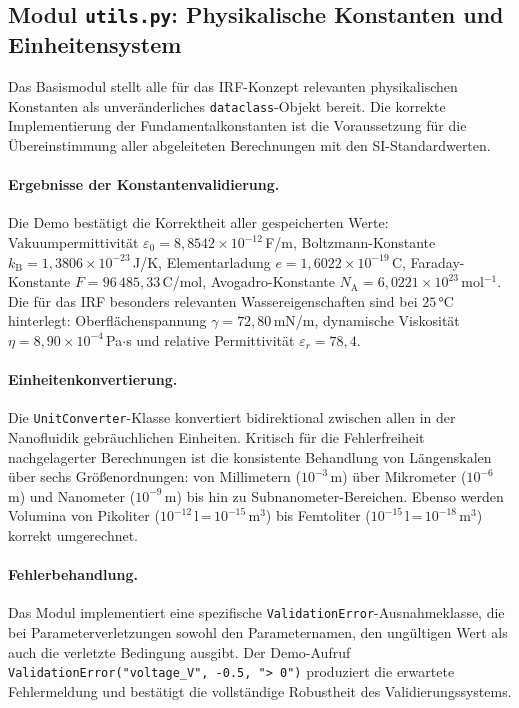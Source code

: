 ﻿\documentclass[a4paper,12pt]{scrreprt}
\theoremstyle{definition}
\begin{document}
\subsection{Modul \texttt{utils.py}: Physikalische Konstanten und Einheitensystem}

Das Basismodul stellt alle für das IRF-Konzept relevanten physikalischen
Konstanten als unveränderliches \texttt{dataclass}-Objekt bereit. Die korrekte
Implementierung der Fundamentalkonstanten ist die Voraussetzung für die
Übereinstimmung aller abgeleiteten Berechnungen mit den SI-Standardwerten.

\paragraph{Ergebnisse der Konstantenvalidierung.}
Die Demo bestätigt die Korrektheit aller gespeicherten Werte:
Vakuumpermittivität $\varepsilon_0 = 8{,}8542 \times 10^{-12}$\,F/m,
Boltzmann-Konstante $k_\text{B} = 1{,}3806 \times 10^{-23}$\,J/K,
Elementarladung $e = 1{,}6022 \times 10^{-19}$\,C,
Faraday-Konstante $F = 96\,485{,}33$\,C/mol,
Avogadro-Konstante $N_\text{A} = 6{,}0221 \times 10^{23}$\,mol$^{-1}$.
Die für das IRF besonders relevanten Wassereigenschaften sind bei $25\, °\text{C}$
hinterlegt: Oberflächenspannung $\gamma = 72{,}80$\,mN/m,
dynamische Viskosität $\eta = 8{,}90 \times 10^{-4}$\,Pa$\cdot$s und
relative Permittivität $\varepsilon_r = 78{,}4$.

\paragraph{Einheitenkonvertierung.}
Die \texttt{UnitConverter}-Klasse konvertiert bidirektional zwischen allen in
der Nanofluidik gebräuchlichen Einheiten. Kritisch für die Fehlerfreiheit
nachgelagerter Berechnungen ist die konsistente Behandlung von Längenskalen über
sechs Größenordnungen: von Millimetern ($10^{-3}$\,m) über Mikrometer ($10^{-6}$\,m)
und Nanometer ($10^{-9}$\,m) bis hin zu Subnanometer-Bereichen. Ebenso werden
Volumina von Pikoliter ($10^{-12}$\,l\,=\,$10^{-15}$\,m$^3$) bis Femtoliter
($10^{-15}$\,l\,=\,$10^{-18}$\,m$^3$) korrekt umgerechnet.

\paragraph{Fehlerbehandlung.}
Das Modul implementiert eine spezifische \texttt{ValidationError}-Ausnahmeklasse,
die bei Parameterverletzungen sowohl den Parameternamen, den ungültigen Wert als
auch die verletzte Bedingung ausgibt. Der Demo-Aufruf
\texttt{ValidationEr\newline ror("voltage\_V", -0.5, "> 0")} produziert die erwartete
Fehlermeldung und bestätigt die vollständige Robustheit des Validierungssystems.
\end{document}
